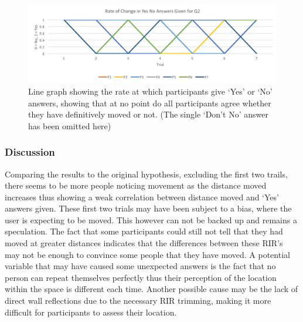 \documentclass[../../main.tex]{subfiles}
\begin{document}
				\begin{figure}[H]
					\centerline{\includegraphics[scale = 0.7]{Sections/userTesting/images/test2/rateofchange.png}}
					\caption{Line graph showing the rate at which participants give `Yes' or `No' answers, showing that at no point do all participants agree whether they have definitively moved or not. (The single `Don't No' answer has been omitted here)}
					\label{test2rate}
				\end{figure}

			\subsubsection{Discussion}

				Comparing the results to the original hypothesis, excluding the first two trails, there seems to be more people noticing movement as the distance moved increases thus showing a weak correlation between distance moved and `Yes' answers given. These first two trials may have been subject to a bias, where the user is expecting to be moved. This however can not be backed up and remains a speculation. The fact that some participants could still not tell that they had moved at greater distances indicates that the differences between these \ac{RIR}'s may not be enough to convince some people that they have moved. A potential variable that may have caused some unexpected answers is the fact that no person can repeat themselves perfectly thus their perception of the location within the space is different each time. Another possible cause may be the lack of direct wall reflections due to the necessary \ac{RIR} trimming, making it more difficult for participants to assess their location.


\end{document}
